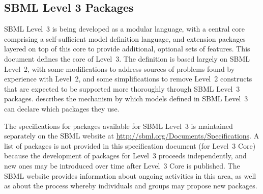 \subsection{SBML Level 3 Packages}
\label{sec:packages}

SBML Level~3 is being developed as a modular language, with a
central core comprising a self-sufficient model definition
language, and extension packages layered on top of this core to
provide additional, optional sets of features.  This document
defines the core of Level~3.  The definition is based largely on
SBML Level~2, with some modifications to address sources of
problems found by experience with Level~2, and some
simplifications to remove Level~2 constructs that are expected to
be supported more thoroughly through SBML Level~3 packages.
 describes the mechanism by which
models defined in SBML Level~3 can declare which packages they
use.  

The specifications for packages available for SBML Level~3 is
maintained separately on the SBML website at
\url{http://sbml.org/Documents/Specifications}.  A list of
packages is not provided in this specification document (\ie for
Level~3 Core) because the development of packages for Level~3
proceeds independently, and new ones may be introduced over time
after Level~3 Core is published.  The SBML website provides
information about ongoing activities in this area, as well as
about the process whereby individuals and groups may propose new
packages.




  

